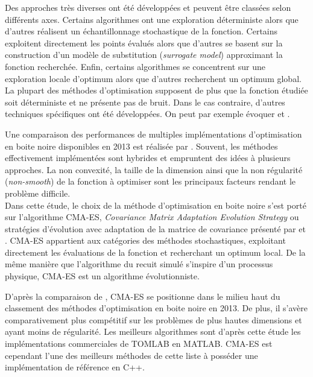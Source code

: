 Des approches très diverses ont été développées et peuvent être
classées selon différents axes.
Certains algorithmes ont une exploration déterministe alors que
d'autres réalisent un échantillonnage stochastique de la fonction.
Certains exploitent directement les points évalués
alors que d'autres se basent sur la construction d'un modèle de substitution
(\textit{surrogate model}) approximant la fonction recherchée.
Enfin, certains algorithmes se concentrent sur une exploration locale
d'optimum alors que d'autres recherchent un optimum global.
La plupart des méthodes d'optimisation supposent de plus que la fonction 
étudiée soit déterministe et ne présente pas de bruit. 
Dans le cas contraire, d'autres techniques spécifiques ont 
été développées. On peut par exemple évoquer 
\cite{coulom_clop:_2011} et \cite{cauwet_noisy_2016}.

Une comparaison des performances de multiples implémentations
d'optimisation en boite noire disponibles en 2013 est réalisée
par \cite{rios_derivative-free_2013}.
Souvent, les méthodes effectivement implémentées sont hybrides
et empruntent des idées à plusieurs approches.
La non convexité, la taille de la dimension ainsi que la non
régularité (\textit{non-smooth}) de la fonction à optimiser 
sont les principaux facteurs rendant le problème difficile.\\

Dans cette étude, le choix de la méthode d'optimisation en boite noire 
s'est porté sur l'algorithme CMA-ES, \textit{Covariance Matrix Adaptation Evolution Strategy}
ou stratégies d'évolution avec adaptation de la matrice de covariance
présenté par \cite{hansen_completely_2001} et \cite{hansen_cma_2006}.
CMA-ES appartient aux catégories des méthodes stochastiques, 
exploitant directement les évaluations de la fonction et 
recherchant un optimum local.
De la même manière que l'algorithme du recuit simulé s'inspire
d'un processus physique, CMA-ES est un algorithme évolutionniste.

D'après la comparaison de \cite{rios_derivative-free_2013},
CMA-ES se positionne dans le milieu haut du classement des méthodes
d'optimisation en boite noire en 2013.
De plus, il s'avère comparativement plus compétitif sur les
problèmes de plus hautes dimensions et ayant moins de régularité.
Les meilleurs algorithmes sont d'après cette étude les implémentations 
commerciales de TOMLAB en MATLAB.
CMA-ES est cependant l'une des meilleurs méthodes de cette liste
à posséder une implémentation de référence en C++.

